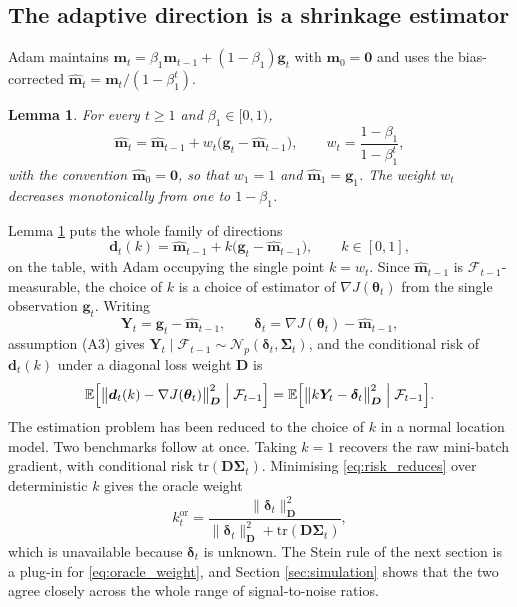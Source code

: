 \documentclass[pdflatex,sn-mathphys-num]{sn-jnl}%
\theoremstyle{thmstyleone}%
\theoremstyle{thmstyletwo}%
\newtheorem{lemma}{Lemma}%
\theoremstyle{thmstylethree}%
\newcommand{\tr}{\mathrm{tr}}
\newcommand{\E}{\mathbb{E}}
\begin{document}
\subsection{The adaptive direction is a shrinkage estimator}

Adam maintains $\bm m_t=\beta_1\bm m_{t-1}+(1-\beta_1)\bm g_t$ with $\bm m_0=\bm 0$ and uses the bias-corrected $\hat{\bm m}_t=\bm m_t/(1-\beta_1^{t})$.

\begin{lemma}
\label{lem:adam_identity}
For every $t\ge1$ and $\beta_1\in[0,1)$,
\begin{equation}
\hat{\bm m}_t=\hat{\bm m}_{t-1}+w_t\bigl(\bm g_t-\hat{\bm m}_{t-1}\bigr),
\qquad
w_t=\frac{1-\beta_1}{1-\beta_1^{t}},
\end{equation}
with the convention $\hat{\bm m}_0=\bm 0$, so that $w_1=1$ and $\hat{\bm m}_1=\bm g_1$. The weight $w_t$ decreases monotonically from one to $1-\beta_1$.
\end{lemma}

Lemma \ref{lem:adam_identity} puts the whole family of directions
\begin{equation}
\label{eq:direction_family}
\bm d_t(k)=\hat{\bm m}_{t-1}+k\bigl(\bm g_t-\hat{\bm m}_{t-1}\bigr),
\qquad
k\in[0,1],
\end{equation}
on the table, with Adam occupying the single point $k=w_t$. Since $\hat{\bm m}_{t-1}$ is $\mathcal F_{t-1}$-measurable, the choice of $k$ is a choice of estimator of $\nabla J(\bm\theta_t)$ from the single observation $\bm g_t$. Writing
\begin{equation}
\label{eq:Ydelta}
\bm Y_t=\bm g_t-\hat{\bm m}_{t-1},
\qquad
\bm\delta_t=\nabla J(\bm\theta_t)-\hat{\bm m}_{t-1},
\end{equation}
assumption (A3) gives $\bm Y_t\mid\mathcal F_{t-1}\sim\mathcal N_p(\bm\delta_t,\bm\Sigma_t)$, and the conditional risk of $\bm d_t(k)$ under a diagonal loss weight $\bm D$ is
\begin{equation}
\label{eq:risk_reduces}
\E\Bigl[\bigl\|\bm d_t(k)-\nabla J(\bm\theta_t)\bigr\|^2_{\bm D}\;\Big|\;\mathcal F_{t-1}\Bigr]
=
\E\Bigl[\bigl\|k\bm Y_t-\bm\delta_t\bigr\|^2_{\bm D}\;\Big|\;\mathcal F_{t-1}\Bigr].
\end{equation}
The estimation problem has been reduced to the choice of $k$ in a normal location model. Two benchmarks follow at once. Taking $k=1$ recovers the raw mini-batch gradient, with conditional risk $\tr(\bm D\bm\Sigma_t)$. Minimising \eqref{eq:risk_reduces} over deterministic $k$ gives the oracle weight
\begin{equation}
\label{eq:oracle_weight}
k^{\mathrm{or}}_t=\frac{\|\bm\delta_t\|^2_{\bm D}}{\|\bm\delta_t\|^2_{\bm D}+\tr(\bm D\bm\Sigma_t)},
\end{equation}
which is unavailable because $\bm\delta_t$ is unknown. The Stein rule of the next section is a plug-in for \eqref{eq:oracle_weight}, and Section \ref{sec:simulation} shows that the two agree closely across the whole range of signal-to-noise ratios.
\end{document}
